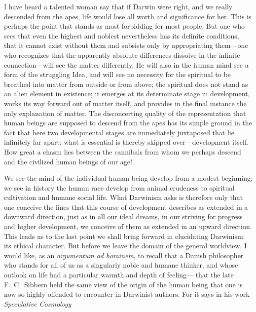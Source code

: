 \documentclass[12pt,a4paper]{article}
\begin{document}
I have heard a talented woman say that if Darwin were right, and we
really descended from the apes, life would lose all worth and
significance for her. This is perhaps the point that stands as most
forbidding for most people. But one who sees that even the highest and
noblest nevertheless has its definite conditions, that it cannot exist
without them and subsists only by appropriating them---one who
recognizes that the apparently absolute differences dissolve in the
infinite connection---will see the matter differently. He will also in
the human mind see a form of the struggling Idea, and will see no
necessity for the spiritual to be breathed into matter from outside or
from above; the spiritual does not stand as an alien element in
existence; it emerges at its determinate stage in development, works
its way forward out of matter itself, and provides in the final
instance the only explanation of matter. The disconcerting quality of
the representation that human beings are supposed to descend from the
apes has its simple ground in the fact that here two developmental
stages are immediately juxtaposed that lie infinitely far apart; what
is essential is thereby skipped over---development itself. How great a
chasm lies between the cannibals from whom we perhaps descend and the
civilized human beings of our age!

We see the mind of the individual human being develop from a modest
beginning; we see in history the human race develop from animal
crudeness to spiritual cultivation and humane social life. What
Darwinism asks is therefore only that one conceive the lines that this
course of development describes as extended in a downward direction,
just as in all our ideal dreams, in our striving for progress and
higher development, we conceive of them as extended in an upward
direction. This leads us to the last point we shall bring forward in
elucidating Darwinism: its ethical character. But before we leave the
domain of the general worldview, I would like, as an
\textit{argumentum ad hominem}, to recall that a Danish philosopher
who stands for all of us as a singularly noble and humane thinker, and
whose outlook on life had a particular warmth and depth of feeling---
that the late F.\ C.\ Sibbern held the same view of the origin of the
human being that one is now so highly offended to encounter in
Darwinist authors. For it says in his work \emph{Speculative
Cosmology}
\end{document}
